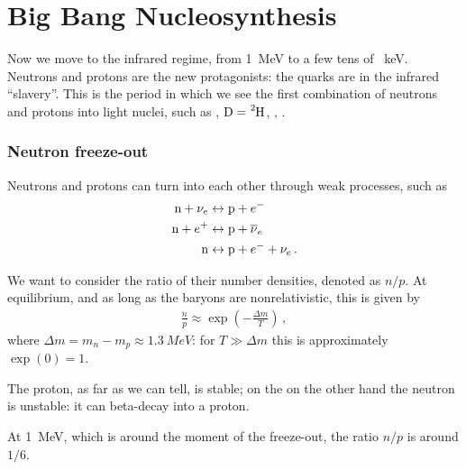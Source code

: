 \documentclass[main.tex]{subfiles}
\begin{document}
\section{Big Bang Nucleosynthesis}





Now we move to the infrared regime, from \SI{1}{MeV} to a few tens of \SI{}{keV}. 
Neutrons and protons are the new protagonists: the quarks are in the infrared ``slavery''.
This is the period in which we see the first combination of neutrons and protons into light nuclei, such as , \(\ce{D} = \ce{^{2}H}\), , .

\subsubsection{Neutron freeze-out}

Neutrons and protons can turn into each other through weak processes, such as 
%
\begin{align}
\ce{n} + \nu_{e} &\leftrightarrow \ce{p} + e^{-} \\
\ce{n} + e^{+} &\leftrightarrow \ce{p} + \overline{\nu}_{e} \\
\ce{n} &\leftrightarrow \ce{p} + e^{-} + \nu_{e}
\,.
\end{align}

We want to consider the ratio of their number densities, denoted as \(n / p\). At equilibrium, and as long as the baryons are nonrelativistic, this is given by 
%
\begin{align}
\frac{n}{p} \approx \exp(- \frac{\Delta m}{T})
\,,
\end{align}
%
where \(\Delta m = m_n - m_p \approx \SI{1.3}{MeV}\): for \(T \gg \Delta m\) this is approximately \(\exp(0) = 1\).

The proton, as far as we can tell, is stable; on the on the other hand the neutron is unstable: it can beta-decay into a proton. 

At \SI{1}{MeV}, which is around the moment of the freeze-out, the ratio \(n/p\) is around \(1/6\). 
\end{document}

